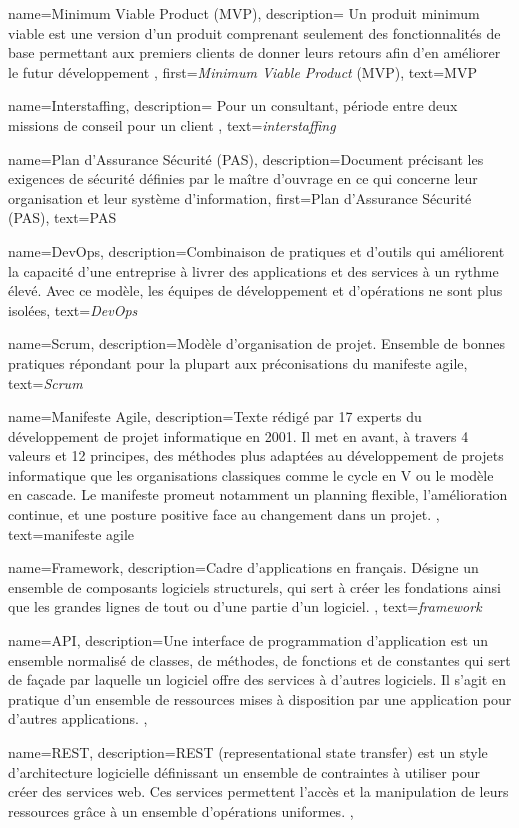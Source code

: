{
    name={Minimum Viable Product (\textsc{MVP})},
    description={
    Un produit minimum viable est une version d'un produit comprenant seulement des fonctionnalités de base permettant aux premiers clients de donner leurs retours afin d'en améliorer le futur développement
    },
    first={\textit{Minimum Viable Product} (\textsc{MVP})},
    text={\textsc{MVP}}
}

{
    name={Interstaffing},
    description={
    Pour un consultant, période entre deux missions de conseil pour un client
    },
    text={\textit{interstaffing}}
}

{
    name={Plan d’Assurance Sécurité (PAS)},
    description={Document précisant les exigences de sécurité définies par le maître d’ouvrage en ce qui concerne leur organisation et leur système d’information},
    first={Plan d’Assurance Sécurité (\textsc{PAS})},
    text={\textsc{PAS}}
}

{
    name={DevOps},
    description={Combinaison de pratiques et d'outils qui améliorent la capacité d'une entreprise à livrer des applications et des services à un rythme élevé.
    Avec ce modèle, les équipes de développement et d'opérations ne sont plus isolées},
    text={\textit{DevOps}}
}

{
    name={Scrum},
    description={Modèle d'organisation de projet. Ensemble de bonnes pratiques répondant pour la plupart aux préconisations du manifeste agile},
    text={\textit{Scrum}}
}

{
    name={Manifeste Agile},
    description={Texte rédigé par 17 experts du développement de projet informatique en 2001. Il met en avant, à travers 4 valeurs et 12 principes, des méthodes plus adaptées au développement de projets informatique que les organisations classiques comme le cycle en V ou le modèle en cascade. Le manifeste promeut notamment un planning flexible, l'amélioration continue, et une posture positive face au changement dans un projet.
},
    text={manifeste agile}
}

{
    name={Framework},
    description={\og Cadre d'applications \fg en français. Désigne un ensemble de composants logiciels structurels, qui sert à créer les fondations ainsi que les grandes lignes de tout ou d’une partie d'un logiciel.
},
    text={\textit{framework}}
}

{
    name={\textsc{API}},
    description={Une interface de programmation d’application est un ensemble normalisé de classes, de méthodes, de fonctions et de constantes qui sert de façade par laquelle un logiciel offre des services à d'autres logiciels. Il s'agit en pratique d'un ensemble de ressources mises à disposition par une application pour d'autres applications.
},
}

{
    name={\textsc{REST}},
    description={REST (representational state transfer) est un style d'architecture logicielle définissant un ensemble de contraintes à utiliser pour créer des services web. Ces services permettent l'accès et la manipulation de leurs ressources grâce à un ensemble d'opérations uniformes.
    },
}